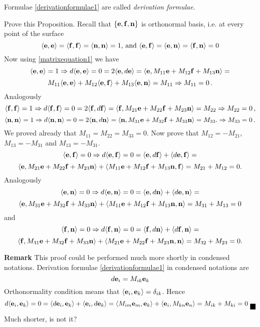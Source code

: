 \documentclass[12pt]{article}
\theoremstyle{theorem}
\numberwithin{equation}{section}
\begin{document}
 \m
Formulae \eqref{derivationformulae1} are called {\it derivation formulae}.


 Prove this Proposition. Recall that $\{{\bf e},{\bf f},{\bf n}\}$ is orthonormal basis, i.e. at every point of the surface
                  $$
  \langle{\bf e},{\bf e}\rangle=\langle{\bf f},{\bf f}\rangle=\langle{\bf n},{\bf n}\rangle=1, \,{\rm and}\,\,
   \langle{\bf e},{\bf f}\rangle=\langle{\bf e},{\bf n}\rangle=\langle{\bf f},{\bf n}\rangle=0
         $$
 Now using \eqref{matrixequation1} we have
         $$
  \langle{\bf e},{\bf e}\rangle=1\Rightarrow d\langle{\bf e},{\bf e}\rangle=0=2\langle{\bf e},d{\bf e}\rangle
  =\langle{\bf e},M_{11}{\bf e}+M_{12}{\bf f}+M_{13}{\bf n}\rangle=
               $$
               $$
               M_{11}\langle{\bf e},{\bf e}\rangle+M_{12}\langle{\bf e},{\bf f}\rangle+
  M_{13}\langle{\bf e},{\bf n}\rangle=M_{11}\Rightarrow M_{11}=0\,.
              $$
 Analogously
           $$
     \langle{\bf f},{\bf f}\rangle=1\Rightarrow d\langle{\bf f},{\bf f}\rangle=0=2\langle{\bf f},d{\bf f}\rangle
  =\langle{\bf f},M_{21}{\bf e}+M_{22}{\bf f}+M_{23}{\bf n}\rangle=M_{22}\Rightarrow M_{22}=0\,,
           $$
            $$
             \langle{\bf n},{\bf n}\rangle=1\Rightarrow d\langle{\bf n},{\bf n}\rangle=0=2\langle{\bf n},d{\bf n}\rangle
  =\langle{\bf n},M_{31}{\bf e}+M_{32}{\bf f}+M_{33}{\bf n}\rangle=M_{33}. \Rightarrow M_{33}=0\,.
            $$
 We proved already that $M_{11}=M_{22}=M_{33}=0$. Now prove that
 $M_{12}=-M_{21}$, $M_{13}=-M_{31}$ and $M_{13}=-M_{31}$.
                       $$
  \langle{\bf e},{\bf f}\rangle=0\Rightarrow d\langle{\bf e},{\bf f}\rangle=0=\langle{\bf e},d{\bf f}\rangle+\langle d{\bf e},{\bf f}\rangle=
             $$
             $$
  \langle{\bf e},M_{21}{\bf e}+M_{22}{\bf f}+M_{23}{\bf n}\rangle+\langle M_{11}{\bf e}+M_{12}{\bf f}+M_{13}{\bf n},{\bf f}\rangle=
  M_{21}+M_{12}=0.
          $$
 Analogously
       $$
       \langle{\bf e},{\bf n}\rangle=0\Rightarrow d\langle{\bf e},{\bf n}\rangle=0=\langle{\bf e},d{\bf n}\rangle+\langle d{\bf e},{\bf n}\rangle=
             $$
             $$
  \langle{\bf e},M_{31}{\bf e}+M_{32}{\bf f}+M_{33}{\bf n}\rangle+\langle M_{11}{\bf e}+M_{12}{\bf f}+M_{13}{\bf n},{\bf n}\rangle=
  M_{31}+M_{13}=0
       $$
 and
          $$
          \langle{\bf f},{\bf n}\rangle=0\Rightarrow d\langle{\bf f},{\bf n}\rangle=0=\langle{\bf f},d{\bf n}\rangle+\langle d{\bf f},{\bf n}\rangle=
             $$
             $$
  \langle{\bf f},M_{31}{\bf e}+M_{32}{\bf f}+M_{33}{\bf n}\rangle+\langle M_{21}{\bf e}+M_{22}{\bf f}+M_{23}{\bf n},{\bf n}\rangle=
  M_{32}+M_{23}=0.
          $$

       {\bf Remark} This proof could be performed much more shortly in condensed notations. Derivation formulae
       \eqref{derivationformulae1} in condensed notations are
          \begin{equation}\label{derivationcondensed}
          d{\bf e}_i=M_{ik}{\bf e}_k
          \end{equation}
     Orthonormality condition means that $\langle{\bf e}_i,{\bf e}_k\rangle=\delta_{ik}$. Hence
        \begin{equation}
   d\langle\e_i,\e_k\rangle=0=\langle d\e_i,\e_k\rangle+\langle\e_i,d\e_k\rangle=
   \langle  M_{im}\e_m,\e_k\rangle+\langle\e_i,M_{kn}\e_n\rangle=M_{ik}+M_{ki}=0\hbox{\finish}
        \end{equation}
    Much shorter, is not it?
\end{document}
